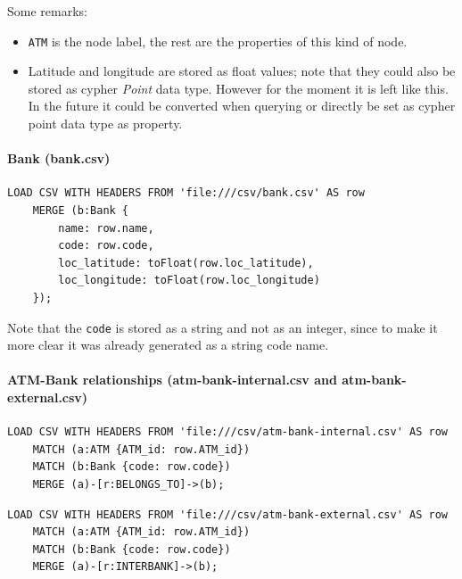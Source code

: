 \documentclass{article}
\begin{document}
\begin{itemize}
Some remarks:
\begin{itemize}
    \item \texttt{ATM} is the node label, the rest are the properties of this kind of node.
    \item Latitude and longitude are stored as float values; note that they could also be stored
    as cypher \textit{Point} data type. However for the moment it is left like this. In the future
    it could be converted when querying or directly be set as cypher point data type as property.
\end{itemize}

\paragraph{Bank (bank.csv)}

\begin{center}
\lstset{style=cypherStyle}
\begin{lstlisting}[caption={bank.csv}]
    LOAD CSV WITH HEADERS FROM 'file:///csv/bank.csv' AS row
    MERGE (b:Bank {
        name: row.name, 
        code: row.code, 
        loc_latitude: toFloat(row.loc_latitude), 
        loc_longitude: toFloat(row.loc_longitude)
    });
\end{lstlisting}
\end{center}

Note that the \texttt{code} is stored as a string and not as an integer, since to make it more clear it 
was already generated as a string code name.

\paragraph{ATM-Bank relationships (atm-bank-internal.csv and atm-bank-external.csv)}

\begin{center}
\lstset{style=cypherStyle}
\begin{lstlisting}[caption={atm-bank-internal.csv}]
    LOAD CSV WITH HEADERS FROM 'file:///csv/atm-bank-internal.csv' AS row
    MATCH (a:ATM {ATM_id: row.ATM_id})
    MATCH (b:Bank {code: row.code})
    MERGE (a)-[r:BELONGS_TO]->(b);
\end{lstlisting}
\end{center}

\begin{center}
\lstset{style=cypherStyle}
\begin{lstlisting}[caption={atm-bank-external.csv}]
    LOAD CSV WITH HEADERS FROM 'file:///csv/atm-bank-external.csv' AS row
    MATCH (a:ATM {ATM_id: row.ATM_id})
    MATCH (b:Bank {code: row.code})
    MERGE (a)-[r:INTERBANK]->(b);
\end{lstlisting}
\end{center}


\end{itemize}
\end{document}
